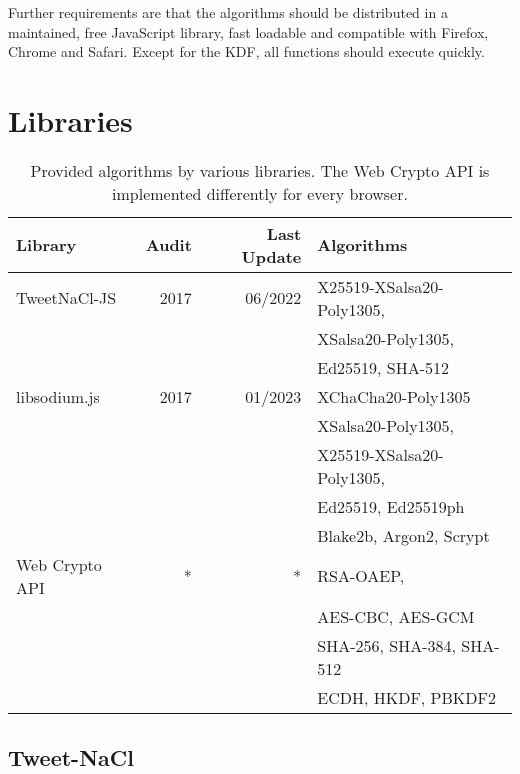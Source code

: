 \documentclass[a4paper, 11pt]{article}
\begin{document}
Further requirements are that the algorithms should be distributed in a maintained, free JavaScript library, fast loadable and compatible with Firefox, Chrome and Safari. Except for the \ac{KDF}, all functions should execute quickly.

\section{Libraries}\label{libraries}

\begin{table}[th]
\caption{Provided algorithms by various libraries. The Web Crypto API is implemented differently for every browser. }
\label{tab:overview}
\begin{tabular}{@{}lrrl@{}}
\toprule
Library        &  Audit & Last Update  & Algorithms \\ \midrule
TweetNaCl-JS   & 2017       &  06/2022    & X25519-XSalsa20-Poly1305,\\
               &            &             & XSalsa20-Poly1305,\\
               &            &             & Ed25519, SHA-512\\
libsodium.js   & 2017       &  01/2023    & XChaCha20-Poly1305\\
               &            &             & XSalsa20-Poly1305,\\
               &            &             & X25519-XSalsa20-Poly1305,\\
               &            &             & Ed25519, Ed25519ph\\
               &            &             & Blake2b, Argon2, Scrypt\\
Web Crypto API & *             & *        &  RSA-OAEP, \\
              &             &             & AES-CBC, AES-GCM              \\
              &             &             & SHA-256, SHA-384, SHA-512\\
              &             &             & ECDH, HKDF, PBKDF2
\\

\bottomrule
\end{tabular}
\end{table}

\subsection{Tweet-NaCl}
\label{sec:tweet-nacl}
\end{document}
